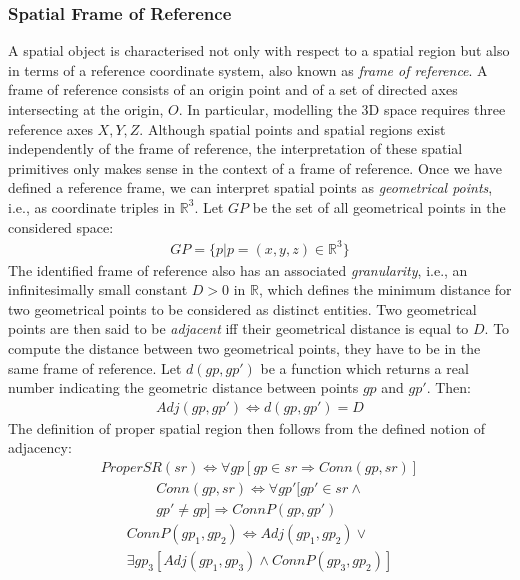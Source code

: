 \documentclass{article}
\begin{document}
\subsubsection{Spatial Frame of Reference}
A spatial object is characterised not only with respect to a spatial region but also in terms of a reference coordinate system, also known as \textit{frame of reference}. A frame of reference consists of an origin point and of a set of directed axes intersecting at the origin, $O$. In particular, modelling the 3D space requires three reference axes $X,Y,Z$. 
Although spatial points and spatial regions exist independently of the frame of reference, the interpretation of these spatial primitives only makes sense in the context of a frame of reference. Once we have defined a reference frame, we can interpret spatial points as \textit{geometrical points}, i.e., as coordinate triples in $\mathbb{R}^3$. Let $GP$ be the set of all geometrical points in the considered space:
\begin{align}
    GP = \{p | p = (x,y,z) \in \mathbb{R}^3\}
\end{align}
The identified frame of reference also has an associated \textit{granularity}, i.e., an infinitesimally small constant $D>0$ in $\mathbb{R}$, which defines the minimum distance for two geometrical points to be considered as distinct entities. Two geometrical points are then said to be \textit{adjacent} iff their geometrical distance is equal to $D$. To compute the distance between two geometrical points, they have to be in the same frame of reference. Let $d(gp,gp')$ be a function which returns a real number indicating the geometric distance between points $gp$ and $gp'$. Then:
\begin{align}
    \textit{Adj}(gp,gp') \Leftrightarrow d(gp,gp') = D
\end{align}
The definition of proper spatial region then follows from the defined notion of adjacency:
\begin{align}
  \textit{ProperSR}(sr) \Leftrightarrow \forall gp [gp\in sr \Rightarrow \textit{Conn}(gp,sr)]  
\end{align}
\begin{multline}
    \textit{Conn}(gp,sr) \Leftrightarrow \forall gp' [gp' \in sr \wedge \\ 
gp' \neq gp] \Rightarrow \textit{ConnP}(gp,gp')
\end{multline}
\begin{multline}
 \textit{ConnP}(gp_1,gp_2)  \Leftrightarrow \textit{Adj}(gp_1,gp_2) \vee \\ 
  \exists gp_3[\textit{Adj}(gp_1,gp_3) \wedge  \textit{ConnP}(gp_3,gp_2)]
\end{multline}
\end{document}
